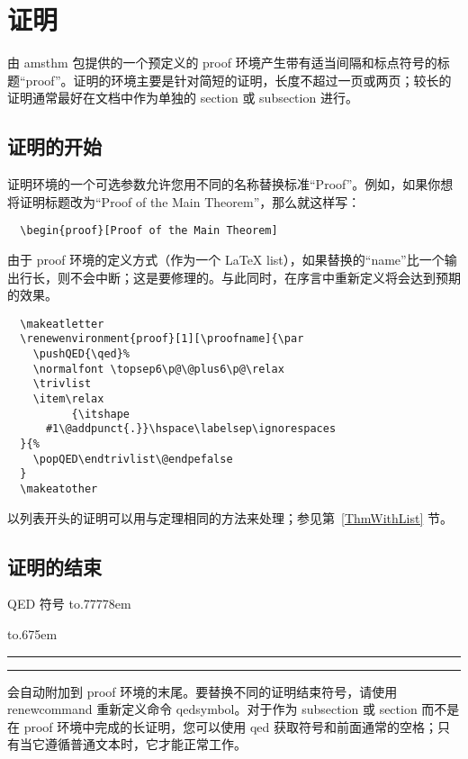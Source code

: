 \documentclass{article}
\providecommand{\qq}[1]{“#1”}
\newcommand{\ntt}{%
  \fontfamily\ttdefault \fontseries\mddefault \fontshape\updefault
  \selectfont
}
\DeclareRobustCommand{\cn}[1]{{\ntt\bslchar#1}}
\DeclareRobustCommand{\pkg}[1]{{\ntt#1}}
\DeclareRobustCommand{\env}[1]{{\ntt#1}}
\providecommand{\qedsymbol}{\leavevmode
  \hbox to.77778em{%
  \hfil\vrule
  \vbox to.675em{\hrule width.6em\vfil\hrule}%
  \vrule\hfil}}
\def\latex/{{\protect\LaTeX}}
\begin{document}


\section{证明}

由 \pkg{amsthm} 包提供的一个预定义的 \env{proof} 环境产生带有适当间隔和标点符号的标题\qq{proof}。证明的环境主要是针对简短的证明，长度不超过一页或两页；较长的证明通常最好在文档中作为单独的 \cn{section} 或 \cn{subsection} 进行。

\subsection{证明的开始}

证明环境的一个可选参数允许您用不同的名称替换标准\qq{Proof}。例如，如果你想将证明标题改为\qq{Proof of the Main Theorem}，那么就这样写：
\begin{verbatim}
  \begin{proof}[Proof of the Main Theorem]
\end{verbatim}

由于 \env{proof} 环境的定义方式（作为一个 \latex/ list），如果替换的“name”比一个输出行长，则不会中断；这是要修理的。与此同时，在序言中重新定义将会达到预期的效果。
\begin{verbatim}
  \makeatletter
  \renewenvironment{proof}[1][\proofname]{\par
    \pushQED{\qed}%
    \normalfont \topsep6\p@\@plus6\p@\relax
    \trivlist
    \item\relax
          {\itshape
      #1\@addpunct{.}}\hspace\labelsep\ignorespaces
  }{%
    \popQED\endtrivlist\@endpefalse
  }
  \makeatother
\end{verbatim}

以列表开头的证明可以用与定理相同的方法来处理；参见第~\ref{ThmWithList} 节。

\subsection{证明的结束}

QED 符号 \qedsymbol{} 会自动附加到 \env{proof} 环境的末尾。要替换不同的证明结束符号，请使用 \cn{renewcommand} 重新定义命令 \cn{qedsymbol}。对于作为 subsection 或 section 而不是在 \env{proof} 环境中完成的长证明，您可以使用 \cn{qed} 获取符号和前面通常的空格；只有当它遵循普通文本时，它才能正常工作。
\end{document}

